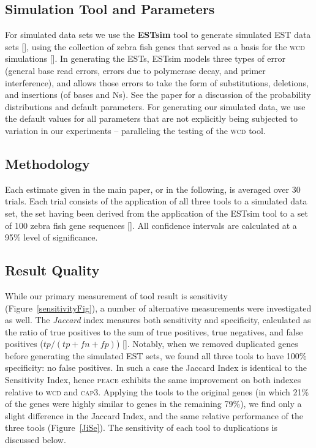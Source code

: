 \documentclass[a4paper,12pt]{article}
\begin{document}
\begin{appendix}
\subsection{Simulation Tool and Parameters}

For simulated data sets we use the {\bf ESTsim} tool to generate
simulated EST data sets [\cite{Hazelhurst03}], using the collection of
zebra fish genes that served as a basis for the \textsc{wcd} simulations
[\cite{Hazelhurst08a}].  In generating the ESTs, ESTsim models three
types of error (general base read errors, errors due to
polymerase decay, and primer interference), and allows those errors to
take the form of substitutions, deletions, and insertions (of bases
and Ns).  See the paper for a discussion of the probability
distributions and default parameters.  For generating our simulated
data, we use the default values for all parameters that are not
explicitly being subjected to variation in our experiments --
paralleling the testing of the \textsc{wcd} tool.



\subsection{Methodology} 

Each estimate given in the main paper, or in the following, is
averaged over 30 trials.  Each trial consists of the application of
all three tools to a simulated data set, the set having been derived
from the application of the ESTsim tool to a set of 100 zebra fish
gene sequences [\cite{Hazelhurst03}].  All confidence intervals are
calculated at a 95\% level of significance.

\subsection{Result Quality}

While our primary measurement of tool result is sensitivity
(Figure~\ref{sensitivityFig}), a number of alternative measurements
were investigated as well. The {\it Jaccard} index measures both
sensitivity and specificity, calculated as the ratio of true positives
to the sum of true positives, true negatives, and false positives ($tp
/ (tp+fn+fp)$) [\cite{Hazelhurst08a}].  Notably, when we removed duplicated genes before
generating the simulated EST sets, we found all three tools to have
100\% specificity: no false positives.  In such a case the Jaccard
Index is identical to the Sensitivity Index, hence \textsc{peace} exhibits the
same improvement on both indexes relative to \textsc{wcd} and \textsc{cap3}.  Applying
the tools to the original genes (in which 21\% of the genes were
highly similar to genes in the remaining 79\%), we find only a slight
difference in the Jaccard Index, and the same relative performance of
the three tools (Figure~\ref{JiSe}).  The sensitivity of each tool to
duplications is discussed below.


\end{appendix}
\end{document}
